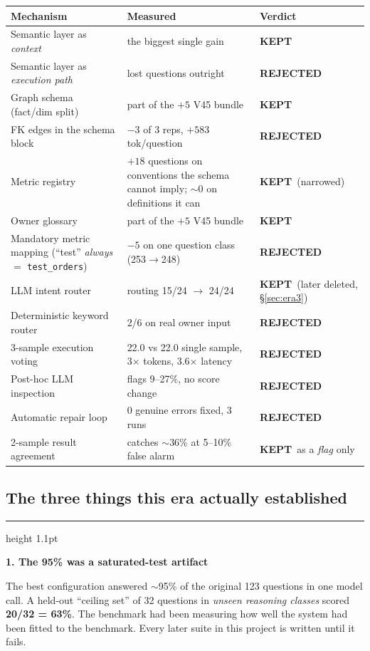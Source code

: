 \documentclass[11pt,a4paper]{report}
\newcommand{\code}[1]{\texttt{\small #1}}
\newenvironment{keybox}[1]
 {\par\medskip\begin{center}\begin{minipage}{0.94\textwidth}%
  {\color{navy}\hrule height 1.1pt}\vspace{5pt}\par
  \textbf{\color{navy}#1}\par\vspace{3pt}\small}
 {\par\vspace{5pt}{\color{mist}\hrule height 0.8pt}\end{minipage}\end{center}\medskip}
\newcommand{\verdictY}{{\color{moss}\textbf{KEPT}}}
\newcommand{\verdictN}{{\color{brick}\textbf{REJECTED}}}
\begin{document}
\begin{center}
\small
\begin{tabular}{@{}p{6.0cm}p{5.0cm}p{3.4cm}@{}}
\toprule
\textbf{Mechanism} & \textbf{Measured} & \textbf{Verdict}\\
\midrule
Semantic layer as \emph{context} & the biggest single gain & \verdictY\\
Semantic layer as \emph{execution path} & lost questions outright & \verdictN\\
Graph schema (fact/dim split) & part of the $+5$ V45 bundle & \verdictY\\
FK edges in the schema block & $-3$ of 3 reps, $+583$ tok/question & \verdictN\\
Metric registry & $+18$ questions on conventions the schema cannot imply; $\sim$0 on definitions it can & \verdictY\ (narrowed)\\
Owner glossary & part of the $+5$ V45 bundle & \verdictY\\
Mandatory metric mapping (``test'' \emph{always} $=$ \code{test\_orders}) & $-5$ on one question class (253$\to$248) & \verdictN\\
LLM intent router & routing 15/24 $\to$ 24/24 & \verdictY\ (later deleted, \S\ref{sec:era3})\\
Deterministic keyword router & 2/6 on real owner input & \verdictN\\
3-sample execution voting & 22.0 vs 22.0 single sample, 3$\times$ tokens, 3.6$\times$ latency & \verdictN\\
Post-hoc LLM inspection & flags 9--27\%, no score change & \verdictN\\
Automatic repair loop & 0 genuine errors fixed, 3 runs & \verdictN\\
2-sample result agreement & catches $\sim$36\% at 5--10\% false alarm & \verdictY\ as a \emph{flag} only\\
\bottomrule
\end{tabular}
\end{center}

\subsection{The three things this era actually established}

\begin{keybox}{1. The 95\% was a saturated-test artifact}
The best configuration answered $\sim$95\% of the original 123 questions in one model call. A
held-out ``ceiling set'' of 32 questions in \emph{unseen reasoning classes} scored
\textbf{20/32 = 63\%}. The benchmark had been measuring how well the system had been fitted to the
benchmark. Every later suite in this project is written until it fails.
\end{keybox}
\end{document}
